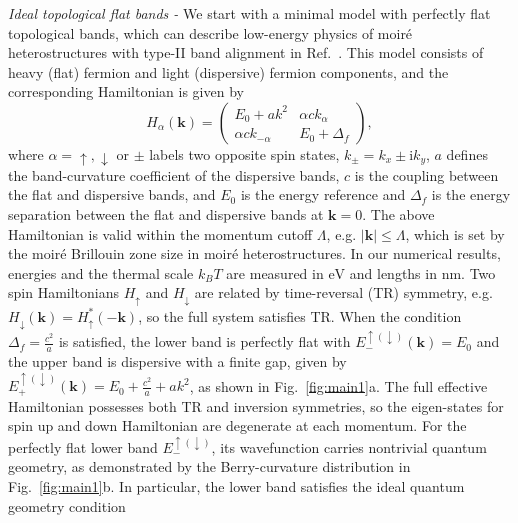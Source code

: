 \documentclass[prl,twocolumn,superscriptaddress,float,aps]{revtex4-2}
\newcommand{\ii}{\mathrm{i}}
\newcommand{\kk}{\mathbf{k}}
\begin{document}

{\it Ideal topological flat bands - } We start with a minimal model with perfectly flat topological bands, which can describe low-energy physics of moir\'e heterostructures with type-II band alignment in Ref.~\cite{liu2025ideal}. This model consists of heavy (flat) fermion and light (dispersive) fermion components, 
and the corresponding Hamiltonian is given by 
\begin{equation}
	H_\alpha(\kk) =
	\begin{pmatrix}
		E_0 + a k^{2} & \alpha c k_{\alpha} \\
		\alpha c k_{-\alpha}    & E_0 + \Delta_f
	\end{pmatrix},
	\label{eq:thf-hamiltonian}
\end{equation}
where $\alpha=\uparrow, \downarrow$ or $\pm$ labels two opposite spin states, $k_{\pm} = k_x \pm \ii k_y$, $a$ defines the band-curvature coefficient of the dispersive bands, $c$ is the coupling between the flat and dispersive bands, and $E_{0}$ is the energy reference and $\Delta_f$ is the energy separation between the flat and dispersive bands at $\kk=0$. The above Hamiltonian is valid within the momentum cutoff $\Lambda$, e.g. $|\kk| \le \Lambda$, which is set by the moir\'e Brillouin zone size in moir\'e heterostructures. In our numerical results, energies and the thermal scale $k_B T$ are measured in $\mathrm{eV}$ and lengths in $\mathrm{nm}$. 
Two spin Hamiltonians $H_\uparrow$ and $H_\downarrow$ are related by time-reversal (TR) symmetry, e.g. $H_\downarrow(\kk) = H_\uparrow^*(-\kk)$, so the full system satisfies TR. When the condition $\Delta_f = \frac{c^{2}}{a}$ is satisfied, the lower band is perfectly flat with $E^{\uparrow (\downarrow)}_{-}(\kk) = E_0$ and the upper band is dispersive with a finite gap, given by $E^{\uparrow (\downarrow)}_{+}(\kk) = E_0 + \frac{c^{2}}{a} + a k^{2}$, as shown in Fig.~\ref{fig:main1}a. The full effective Hamiltonian possesses both TR and inversion symmetries, so the eigen-states for spin up and down Hamiltonian are degenerate at each momentum. For the perfectly flat lower band $E^{\uparrow (\downarrow)}_-$, its wavefunction carries nontrivial quantum geometry, as demonstrated by the Berry-curvature distribution in Fig.~\ref{fig:main1}b. In particular, the lower band satisfies the ideal quantum geometry condition
\end{document}
